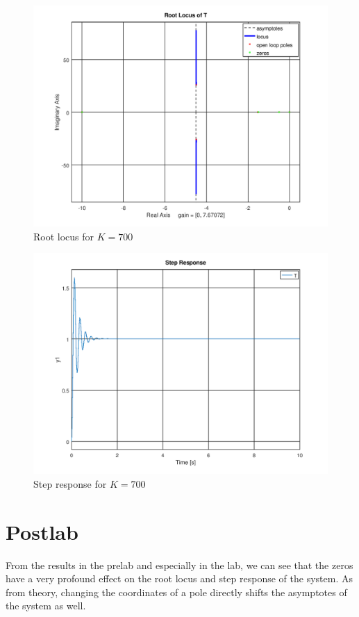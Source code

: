 \documentclass[12pt, a4paper]{article}
\begin{document}
		\begin{figure}[H]
			\centering
			\includegraphics[width=.8\textwidth]{img/rlocus_700.png}
			\caption{Root locus for $K = 700$}
			\label{fig:rlocus_700}
		\end{figure}

		\begin{figure}[H]
			\centering
			\includegraphics[width=.8\textwidth]{img/step_700.png}
			\caption{Step response for $K = 700$}
			\label{fig:step_700}
		\end{figure}

	\section{Postlab} %
	\label{sec:postlab}
		From the results in the prelab and especially in the lab, we can see that the zeros have a very profound effect on the root locus and step response of the system. As from theory, changing the coordinates of a pole directly shifts the asymptotes of the system as well.
\end{document}
